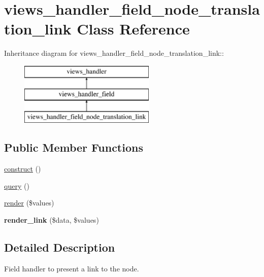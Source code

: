 \hypertarget{classviews__handler__field__node__translation__link}{
\section{views\_\-handler\_\-field\_\-node\_\-translation\_\-link Class Reference}
\label{classviews__handler__field__node__translation__link}
}
Inheritance diagram for views\_\-handler\_\-field\_\-node\_\-translation\_\-link::\begin{figure}[H]
\begin{center}
\leavevmode
\includegraphics[height=3cm]{classviews__handler__field__node__translation__link}
\end{center}
\end{figure}
\subsection*{Public Member Functions}
\begin{DoxyCompactItemize}
\item 
\hyperlink{classviews__handler__field__node__translation__link_a834c20607c0a929900b7ace53425847a}{construct} ()
\item 
\hyperlink{classviews__handler__field__node__translation__link_accd7784b851085dadf55b773f1845097}{query} ()
\item 
\hyperlink{classviews__handler__field__node__translation__link_a24fd39ca3d02b69858986ee7ba580d41}{render} (\$values)
\item 
\hypertarget{classviews__handler__field__node__translation__link_a902ffa1646da224c51aaf5541266e430}{
{\bfseries render\_\-link} (\$data, \$values)}
\label{classviews__handler__field__node__translation__link_a902ffa1646da224c51aaf5541266e430}

\end{DoxyCompactItemize}


\subsection{Detailed Description}
Field handler to present a link to the node. 

